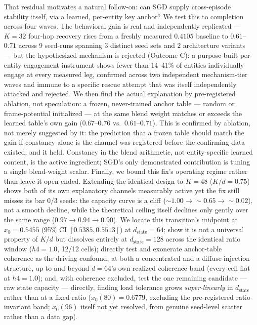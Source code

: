 That residual motivates a natural follow-on: can SGD supply cross-episode
stability itself, via a learned, per-entity key anchor? We test this to
completion across four waves. The behavioral gain is real and
independently replicated --- $K{=}32$ four-hop recovery rises from a
freshly measured $0.4105$ baseline to $0.61$--$0.71$ across 9 seed-runs
spanning 3 distinct seed sets and 2 architecture variants --- but the
hypothesized mechanism is rejected (Outcome C): a purpose-built
per-entity engagement instrument shows fewer than 14--41\% of entities
individually engage at every measured leg, confirmed across two
independent mechanism-tier waves and immune to a specific rescue attempt
that was itself independently attacked and rejected. We then find the
actual explanation by pre-registered ablation, not speculation: a frozen,
never-trained anchor table --- random or frame-potential initialized ---
at the same blend weight matches or exceeds the learned table's own gain
($0.67$--$0.76$ vs.\ $0.61$--$0.71$). This is confirmed by ablation, not
merely suggested by it: the prediction that a frozen table should match
the gain if constancy alone is the channel was registered before the
confirming data existed, and it held. Constancy in the blend arithmetic,
not entity-specific learned content, is the active ingredient; SGD's only
demonstrated contribution is tuning a single blend-weight scalar. Finally,
we bound this fix's operating regime rather than leave it open-ended.
Extending the identical design to $K{=}48$ ($K/d{=}0.75$) shows both of
its own explanatory channels measurably active yet the fix still misses
its bar 0/3 seeds: the capacity curve is a cliff
($\sim1.00\to\sim0.65\to\sim0.02$), not a smooth decline, while the
theoretical ceiling itself declines only gently over the same range
($0.97\to0.94\to0.90$). We locate this transition's midpoint at
$x_0{=}0.5455$ (95\% CI $[0.5385,0.5513]$) at $d_{\mathrm{state}}{=}64$;
show it is not a universal property of $K/d$ but dissolves entirely at
$d_{\mathrm{state}}{=}128$ across the identical ratio window ($h4{=}1.0$,
12/12 cells); directly test and exonerate anchor-table coherence as the
driving confound, at both a concentrated and a diffuse injection
structure, up to and beyond $d{=}64$'s own realized coherence band (every
cell flat at $h4{=}1.0$); and, with coherence excluded, test the one
remaining candidate --- raw state capacity --- directly, finding load
tolerance grows \emph{super-linearly} in $d_{\mathrm{state}}$ rather than
at a fixed ratio ($x_0(80){=}0.6779$, excluding the pre-registered
ratio-invariant band; $x_0(96)$ itself not yet resolved, from genuine
seed-level scatter rather than a data gap).


